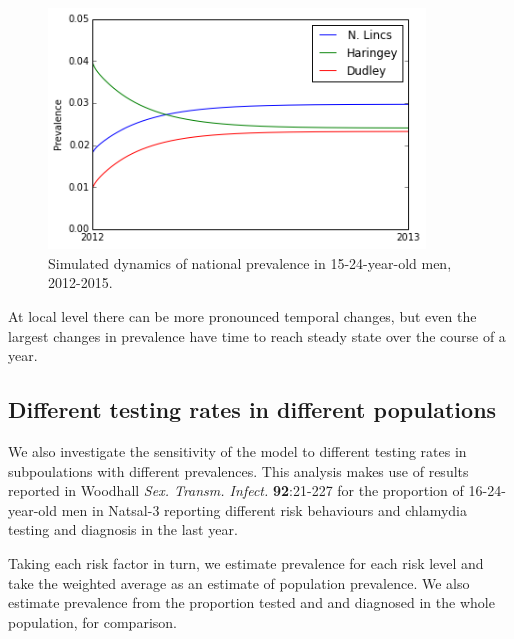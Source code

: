 \documentclass{article}
\begin{document}
    \begin{figure}
        \begin{center}\includegraphics[width=10cm]{three_compartment_model_files/three_compartment_model_22_1.png}\end{center}
        \caption{Simulated dynamics of national prevalence in 15-24-year-old men, 2012-2015.}
        \label{}
    \end{figure}
    
    At local level there can be more pronounced temporal changes, but even
the largest changes in prevalence have time to reach steady state over
the course of a year.

\subsection{Different testing rates in different
populations}\label{different-testing-rates-in-different-populations}

We also investigate the sensitivity of the model to different testing
rates in subpoulations with different prevalences. This analysis makes
use of results reported in Woodhall \emph{Sex. Transm. Infect.}
\textbf{92}:21-227 for the proportion of 16-24-year-old men in Natsal-3
reporting different risk behaviours and chlamydia testing and diagnosis
in the last year.

Taking each risk factor in turn, we estimate prevalence for each risk
level and take the weighted average as an estimate of population
prevalence. We also estimate prevalence from the proportion tested and
and diagnosed in the whole population, for comparison.
\end{document}

